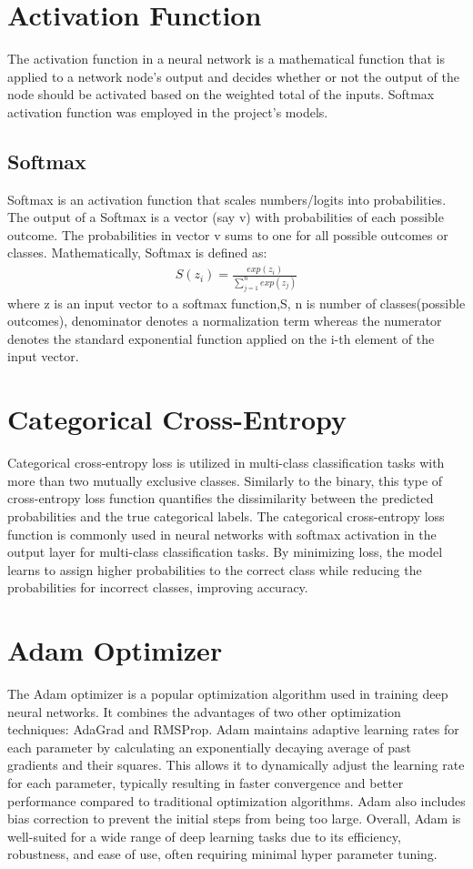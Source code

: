\section{Activation Function}
\vspace{-18pt}
The activation function in a neural network is a mathematical function that is applied to a network node's output and decides whether or not the output of the node should be activated based on the weighted total of the inputs. Softmax activation function was employed in the project's models.
\subsection{Softmax}
\vspace{-18pt}
Softmax is an activation function that scales numbers/logits into probabilities. The output of a Softmax is a vector (say v) with probabilities of each possible outcome. The probabilities in vector v sums to one for all possible outcomes or classes. Mathematically, Softmax is defined as: 
\begin{eqnarray}
	S(z_{i}) = \frac{exp(z_{i})}{\sum_{j=1}^{n} exp(z_{j})}
\end{eqnarray}
where z is an input vector to a softmax function,S, n is number of classes(possible outcomes), denominator denotes a normalization term whereas the numerator denotes the standard exponential function applied on the i-th element of the input vector.
\section{Categorical Cross-Entropy}
\vspace{-18pt}
Categorical cross-entropy loss is utilized in multi-class classification tasks with more than two mutually exclusive classes. Similarly to the binary, this type of cross-entropy loss function quantifies the dissimilarity between the predicted probabilities and the true categorical labels. The categorical cross-entropy loss function is commonly used in neural networks with softmax activation in the output layer for multi-class classification tasks. By minimizing loss, the model learns to assign higher probabilities to the correct class while reducing the probabilities for incorrect classes, improving accuracy.
\section{Adam Optimizer}
\vspace{-18pt}
The Adam optimizer is a popular optimization algorithm used in training deep neural networks. It combines the advantages of two other optimization techniques: AdaGrad and RMSProp. Adam maintains adaptive learning rates for each parameter by calculating an exponentially decaying average of past gradients and their squares. This allows it to dynamically adjust the learning rate for each parameter, typically resulting in faster convergence and better performance compared to traditional optimization algorithms. Adam also includes bias correction to prevent the initial steps from being too large. Overall, Adam is well-suited for a wide range of deep learning tasks due to its efficiency, robustness, and ease of use, often requiring minimal hyper parameter tuning.

